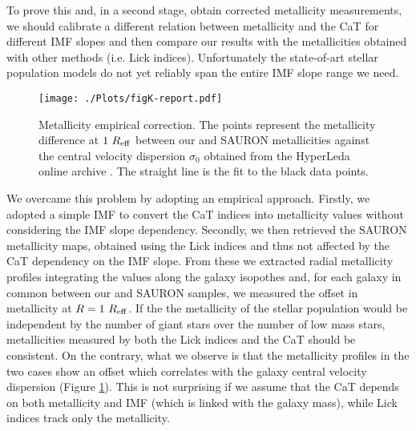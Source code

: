 	To prove this and, in a second stage, obtain corrected metallicity measurements, we should 
	calibrate a different relation between metallicity and the CaT for different IMF slopes and then 
	compare our results with the metallicities obtained with other methods (i.e. Lick indices). 
	Unfortunately the state-of-art stellar population models do not yet reliably span the entire 
	IMF slope range we need. 
	
	\begin{figure}
	\begin{center}
		\texttt{[image: ./Plots/figK-report.pdf]}
	\end{center}
		\caption{Metallicity empirical correction. 
  					The points represent the metallicity difference at $1~R_{\rm{eff}}$ between our and SAURON 
  					metallicities against the central velocity dispersion $\sigma_{0}$ obtained from the 
  					 HyperLeda%
  					online archive \citep{Paturel03}. 
  					The straight line is the fit to the black data points. 
  					}\label{fig:IMFcorrection}
	\end{figure}

	We overcame this problem by adopting an empirical approach. 
	Firstly, we adopted a simple \citet{Salpeter55} IMF to convert the CaT indices into 
	metallicity values without considering the IMF slope dependency. 
	Secondly, we then retrieved the SAURON metallicity maps, obtained using the Lick 
	indices and thus not affected by the CaT dependency on the IMF slope. 
	From these we extracted radial metallicity profiles integrating the values along 
	the galaxy isopothes and, for each galaxy in common between our and SAURON samples, 
	we measured the offset in metallicity at $R = 1~R_{\rm{eff}}$. 
	If the the metallicity of the stellar population would be independent by the number of giant stars 
	over the number of low mass stars, metallicities 
	measured by both the Lick indices and the CaT should be consistent. 
	On the contrary, what we observe is that the metallicity profiles in the two cases show an offset 
	which correlates with the galaxy central velocity dispersion (Figure \ref{fig:IMFcorrection}). 
	This is not surprising if we assume that the CaT depends on both metallicity and IMF (which is 
	linked with the galaxy mass), while Lick indices track only the metallicity. 
		
